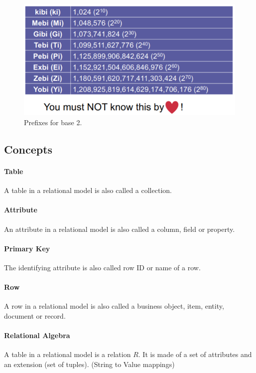 \begin{figure}[h]
	\centering
	\includegraphics[scale=0.5]{images/1-prefixesb2.PNG}
	\caption{Prefixes for base 2.}
	\label{fig:prefix2}
\end{figure}

\subsection{Concepts}

\paragraph{Table}
A table in a relational model is also called a collection.

\paragraph{Attribute}
An attribute in a relational model is also called a column, field or property.

\paragraph{Primary Key}
The identifying attribute is also called row ID or name of a row.

\paragraph{Row}
A row in a relational model is also called a business object, item, entity, document or record.

\paragraph{Relational Algebra}
A table in a relational model is a relation $R$. It is made of a set of attributes and an extension (set of tuples). (String to Value mappings)

